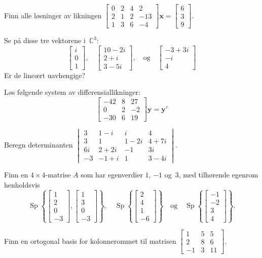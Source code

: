 \documentclass[titlepage,a4paper,12pt,norsk]{IMFeksamen}
\newcommand{\C}{\mathbb{C}}
\DeclareMathOperator{\Sp}{Sp}
\newcommand{\V}[1]{\mathbf{#1}}
\newcommand{\vvv}[3]{\begin{bmatrix} #1 \\ #2 \\ #3 \end{bmatrix}}
\newcommand{\vvvv}[4]{\begin{bmatrix} #1 \\ #2 \\ #3 \\ #4 \end{bmatrix}}
\newcommand{\x}{\V{x}}
\newcommand{\0}{\V{0}}
\begin{document}
\begin{oppgave}
Finn alle løsninger av likningen
$
\begin{bmatrix}
0 & 2 & 4 &   2 \\
2 & 1 & 2 & -13 \\
1 & 3 & 6 &  -4
\end{bmatrix}
\x
= \vvv{6}{3}{9}
$.
\end{oppgave}


\begin{oppgave}
Se på disse tre vektorene i~$\C^3$:
\[
\vvv{i}{0}{1},\quad
\vvv{10-2i}{2+i}{3-5i},\quad\text{og}\quad
\vvv{-3+3i}{-i}{4}
\]
Er de lineært uavhengige?
\end{oppgave}


\begin{oppgave}
Løs følgende system av differensiallikninger:
\[
\begin{bmatrix}
-42 & 8 & 27 \\
  0 & 2 & -2 \\
-30 & 6 & 19
\end{bmatrix}
\V{y}
= \V{y}'
\]
\end{oppgave}


\begin{oppgave}
Beregn determinanten
$
\begin{vmatrix}
 3 &  1 - i  & i      & 4      \\
 3 &  1      & 1 - 2i & 4 + 7i \\
6i &  2 + 2i & -1     & 3i     \\
-3 & -1 + i  & 1      & 3 - 4i
\end{vmatrix}
$.
\end{oppgave}


\begin{oppgave}
Finn en $4 \times 4$-matrise $A$ som har egenverdier $1$, $-1$ og~$3$,
med tilhørende egenrom henholdsvis
\[
\Sp \left\{ \vvvv{1}{2}{0}{-3}, \vvvv{1}{3}{0}{-3} \right\},\quad
\Sp \left\{ \vvvv{2}{4}{1}{-6} \right\}
\quad\text{og}\quad
\Sp \left\{ \vvvv{-1}{-2}{3}{4} \right\}.
\]
\end{oppgave}


\begin{oppgave}
Finn en ortogonal basis for kolonnerommet til matrisen
$
\begin{bmatrix}
1 & 5 & 5 \\
2 & 8 & 6 \\
-1 & 3 & 11
\end{bmatrix}
$.
\end{oppgave}
\end{document}
